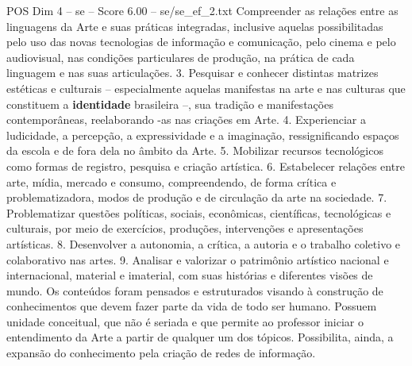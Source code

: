 \begin{textsample}{POS Dim 4 – se – Score 6.00 – se/se\_ef\_2.txt}
Compreender as relações entre as linguagens da Arte e suas práticas integradas, inclusive aquelas possibilitadas pelo uso das novas tecnologias de informação e comunicação, pelo cinema e pelo audiovisual, nas condições particulares de produção, na prática de cada linguagem e nas suas articulações. 3.
Pesquisar e conhecer distintas matrizes estéticas e culturais – especialmente aquelas manifestas na arte e nas culturas que constituem a \textbf{identidade} brasileira –, sua tradição e manifestações contemporâneas, reelaborando -as nas criações em Arte. 4.
Experienciar a ludicidade, a percepção, a expressividade e a imaginação, ressignificando espaços da escola e de fora dela no âmbito da Arte. 5.
Mobilizar recursos tecnológicos como formas de registro, pesquisa e criação artística. 6.
Estabelecer relações entre arte, mídia, mercado e consumo, compreendendo, de forma crítica e problematizadora, modos de produção e de circulação da arte na sociedade. 7.
Problematizar questões políticas, sociais, econômicas, científicas, tecnológicas e culturais, por meio de exercícios, produções, intervenções e apresentações artísticas. 8.
Desenvolver a autonomia, a crítica, a autoria e o trabalho coletivo e colaborativo nas artes. 9.
Analisar e valorizar o patrimônio artístico nacional e internacional, material e imaterial, com suas histórias e diferentes visões de mundo.
Os conteúdos foram pensados e estruturados visando à construção de conhecimentos que devem fazer parte da vida de todo ser humano.
Possuem unidade conceitual, que não é seriada e que permite ao professor iniciar o entendimento da Arte a partir de qualquer um dos tópicos.
Possibilita, ainda, a expansão do conhecimento pela criação de redes de informação.

\end{textsample}
